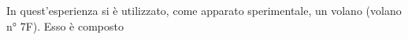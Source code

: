 In quest'esperienza si è utilizzato, come apparato sperimentale, un volano (volano n° 7F). Esso è composto 
